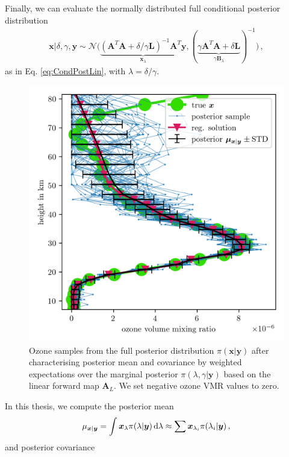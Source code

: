 Finally, we can evaluate the normally distributed full conditional posterior distribution
\begin{align}
	\bm{x}| \delta, \gamma, \bm{y}  \sim \mathcal{N}\big( \underbrace{ (\bm{A}^T \bm{A} + \delta / \gamma \bm{L} )^{-1} \bm{A}^T \bm{y}}_{\bm{x}_{\lambda}}, ( \underbrace{ \gamma \bm{A}^T \bm{A} + \delta \bm{L} }_{\gamma \bm{B}_{\lambda}}  )^{-1} \big) \, \label{eq:CondPost},
\end{align}
as in Eq. \ref{eq:CondPostLin}, with $\lambda = \delta / \gamma $.
\begin{figure}[ht!]
	\centering
	\includegraphics{FirstTestRes.png}
	\caption[Ozone samples of the full posterior.]{Ozone samples from the full posterior distribution $\pi(\bm{x}| \bm{y})$ after characterising posterior mean and covariance by weighted expectations over the marginal posterior $\pi(\lambda,\gamma | \bm{y})$ based on the linear forward map $\bm{A}_L$. We set negative ozone VMR values to zero.}
	\label{fig:O3Samp}
\end{figure}
In this thesis, we compute the posterior mean
\begin{align}
	\mu_{\bm{x}|\bm{y}} = \int \bm{x}_{\lambda} \pi(\lambda| \bm{y}) \mathop{}\!\mathrm{d}\lambda \approx \sum \bm{x}_{\lambda_i} \pi(\lambda_i| \bm{y}) \, , \label{eq:MeanInt}
\end{align} and posterior covariance
